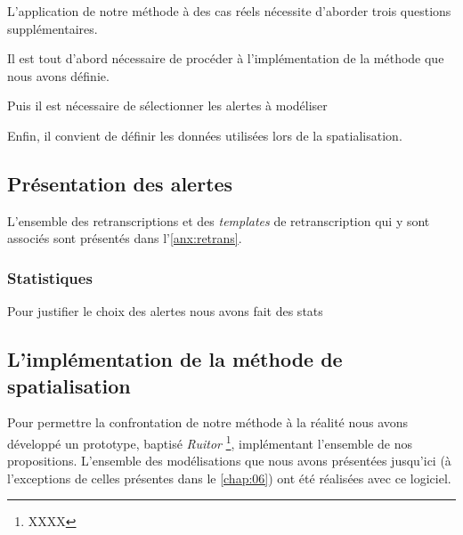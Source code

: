 L’application de notre méthode à des cas réels nécessite d'aborder
trois questions supplémentaires.

Il est tout d'abord nécessaire de procéder à l'implémentation de la
méthode que nous avons définie.

Puis il est nécessaire de sélectionner les alertes à modéliser

Enfin, il convient de définir les données utilisées lors de la
spatialisation.

\subsection{Présentation des alertes}



L'ensemble des retranscriptions et des \emph{templates} de
retranscription qui y sont associés sont présentés dans
l'\autoref{anx:retrans}.


\subsubsection{Statistiques}

Pour justifier le choix des alertes nous avons fait des stats 


\subsection{L'implémentation de la méthode de spatialisation}

Pour permettre la confrontation de notre méthode à la réalité nous
avons développé un prototype, baptisé \emph{Ruitor} \footnote{XXXX},
implémentant l'ensemble de nos propositions.
%
L'ensemble des modélisations que nous avons présentées jusqu'ici (à
l'exceptions de celles présentes dans le \autoref{chap:06}) ont été
réalisées avec ce logiciel.

